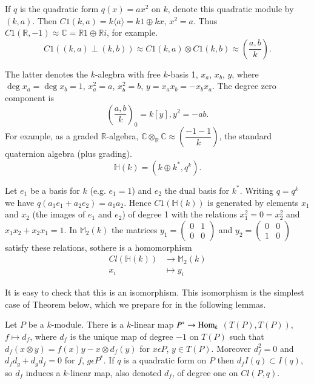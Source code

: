 \setcounter{examples}{1}
\begin{examples}%
If $q$ is the quadratic form $q(x) = ax^2$ on $k$, denote this
quadratic module by $(k, a)$. Then $C1 (k, a) = k\langle a \rangle =
k1 \oplus kx$, $x^2 = a$. Thus $C1 (\mathbb{R}, -1) \approx \mathbb{C}
= \mathbb{R} 1 \oplus \mathbb{R}i$, for example. 
\begin{equation*}
C1 ((k, a) \perp (k, b)) \approx C1 (k, a) \otimes C1 (k, b) \approx
(\frac{a, b}{k}). \tag{3.3}\label{eq3.3}
\end{equation*}

The latter denotes the $k$-alegbra with free $k$-basis 1, $x_a$, $x_b$,
$y$, where $\deg x_a = \deg x_b = 1$, $x^2_a =a$, $x^2_b = b$, $y =
x_a x_b = -x_b x_a$. The degree zero component is  
$$
\left( \frac{a, b}{k}\right)_0 = k[y], y^2 = -ab. 
$$
For example, as a graded $\mathbb{R}$-algebra, $\mathbb{C}
\otimes_{\mathbb{R}} \mathbb{C} \approx ( \dfrac{-1-1}{k})$, the
standard quaternion algebra (plus grading). 
\begin{equation*}
\mathbb{H} (k) = (k \oplus k^\ast, q^k).  \tag{3.4}\label{eq3.4}
\end{equation*}

Let $e_1$ be a  basis for $k$ (e.g. $e_1 = 1$)
and $e_2$ the dual basis for $k^\ast$. Writing $q=q^k$ we have $q(a_1 e_1
+ a_2 e_2) = a_1 a_2$. Hence $C1 (\mathbb{H}(k))$ is generated by
elements $x_1$ and $x_2$ (the images of $e_1$ and $e_2$) of degree 1
with the relations $x^2_1 = 0 = x^2_2$ and $x_1 x_2 + x_2 x_1 = 1$. In
$\mathbb{M}_2 (k)$ the matrices $y_1 = \left( \begin{smallmatrix} 0 &
  1 \\ 0 & 0 \end{smallmatrix}\right)$ and $ y_2=
\left( \begin{smallmatrix} 0 & 0 \\ 1 & 0 \end{smallmatrix}\right)$
satisfy these relations, so\pageoriginale there is a homomorphism 
\begin{align*}
Cl (\mathbb{H}(k)) &\to \mathbb{M}_2 (k) \\
x_i &\mapsto y_i
\end{align*}

It is easy to check that this is an isomorphism. This isomorphism is
the simplest case of Theorem below, which we prepare for in the
following lemmas. 
\end{examples}

\setcounter{lemma}{4}
\begin{lemma}\label{chap5:lem3.5}%
 Let $P$ be a $k$-module. There is a $k$-linear map $P^\ast \to \operatorname{Hom}_k$
 $(T(P), T(P))$, $f \mapsto d_f$, where $d_f$ is the unique map of
 degree $-1$ on $T(P)$ such that $d_f (x \otimes y) = f(x) y - x
 \otimes d_f (y)$ for $x \epsilon P$, $y \in T (P)$. Moreover $d^2_f =0$
 and $d_f d_g + d_g d_f = 0$ for $f$, $g \epsilon P^*$. If $q$ is a
 quadratic form on $P$ then $d_f I (q) \subset I(q)$, so $d_f$ induces
 a $k$-linear map, also denoted $d_f$, of degree one on $Cl(P, q)$. 
\end{lemma}

